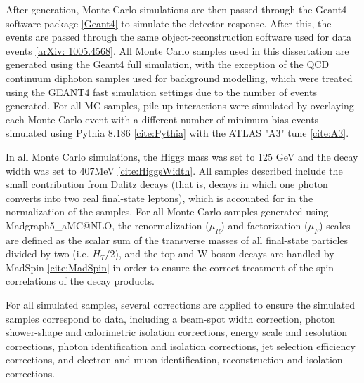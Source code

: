 After generation, Monte Carlo simulations are then passed through the Geant4 software package \ref{Geant4} to simulate the detector response. After this, the events are passed through the same object-reconstruction software used for data events \ref{arXiv: 1005.4568}. All Monte Carlo samples used in this dissertation are generated using the Geant4 full simulation, with the exception of the QCD continuum diphoton samples used for background modelling, which were treated using the GEANT4 fast simulation settings due to the number of events generated. For all MC samples, pile-up interactions were simulated by overlaying each Monte Carlo event with a different number of minimum-bias events simulated using Pythia 8.186 \ref{cite:Pythia} with the ATLAS "A3" tune \ref{cite:A3}.

In all Monte Carlo simulations, the Higgs mass was set to 125 GeV and the decay width was set to 407MeV \ref{cite:HiggsWidth}. All samples described include the small contribution from Dalitz decays (that is, decays in which one photon converts into two real final-state leptons), which is accounted for in the normalization of the samples. For all Monte Carlo samples generated using Madgraph5_aMC@NLO, the renormalization ($μ_{R}$) and factorization ($μ_{F}$) scales are defined as the scalar sum of the transverse masses of all final-state particles divided by two (i.e. $H_{T}/2$), and the top and W boson decays are handled by MadSpin \ref{cite:MadSpin} in order to ensure the correct treatment of the spin correlations of the decay products.

For all simulated samples, several corrections are applied to ensure the simulated samples correspond to data, including a beam-spot width correction, photon shower-shape and calorimetric isolation corrections, energy scale and resolution corrections, photon identification and isolation corrections, jet selection efficiency corrections, and electron and muon identification, reconstruction and isolation corrections.

